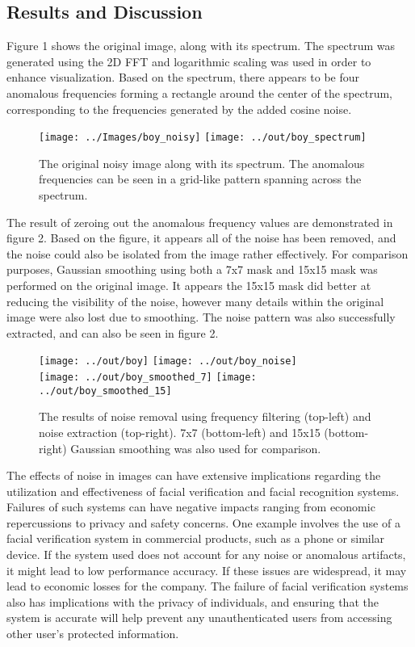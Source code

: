 \documentclass[headings=optiontoheadandtoc,listof=totoc,parskip=full]{scrartcl}
\begin{document}
\subsection{Results and Discussion}

Figure 1 shows the original image, along with its spectrum. The spectrum was generated using the 2D FFT and logarithmic scaling was used in order to enhance visualization. Based on the spectrum, there appears to be four anomalous frequencies forming a rectangle around the center of the spectrum, corresponding to the frequencies generated by the added cosine noise. 

\begin{figure}[H]
	\centering
	\texttt{[image: ../Images/boy\_noisy]}
	\texttt{[image: ../out/boy\_spectrum]}
	\caption{The original noisy image along with its spectrum. The anomalous frequencies can be seen in a grid-like pattern spanning across the spectrum.}
	\label{fig:boyNoisy}
\end{figure}

The result of zeroing out the anomalous frequency values are demonstrated in figure 2. Based on the figure, it appears all of the noise has been removed, and the noise could also be isolated from the image rather effectively. For comparison purposes, Gaussian smoothing using both a 7x7 mask and 15x15 mask was performed on the original image. It appears the 15x15 mask did better at reducing the visibility of the noise, however many details within the original image were also lost due to smoothing. The noise pattern was also successfully extracted, and can also be seen in figure 2.

\begin{figure}[H]
	\centering
	\texttt{[image: ../out/boy]}
	\texttt{[image: ../out/boy\_noise]} \\
	\texttt{[image: ../out/boy\_smoothed\_7]}
	\texttt{[image: ../out/boy\_smoothed\_15]}
	\caption{The results of noise removal using frequency filtering (top-left) and noise extraction (top-right). 7x7 (bottom-left) and 15x15 (bottom-right) Gaussian smoothing was also used for comparison.}
	\label{fig:boy}
\end{figure}

The effects of noise in images can have extensive implications regarding the utilization and effectiveness of facial verification and facial recognition systems. Failures of such systems can have negative impacts ranging from economic repercussions to privacy and safety concerns. One example involves the use of a facial verification system in commercial products, such as a phone or similar device. If the system used does not account for any noise or anomalous artifacts, it might lead to low performance accuracy. If these issues are widespread, it may lead to economic losses for the company. The failure of facial verification systems also has implications with the privacy of individuals, and ensuring that the system is accurate will help prevent any unauthenticated users from accessing other user’s protected information.
\end{document}
